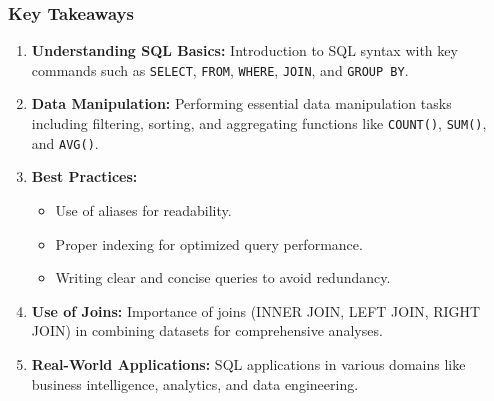 \documentclass{beamer}
\begin{document}
\begin{frame}[fragile]
    \frametitle{Key Takeaways}
    \begin{enumerate}
        \item \textbf{Understanding SQL Basics:} Introduction to SQL syntax with key commands such as \texttt{SELECT}, \texttt{FROM}, \texttt{WHERE}, \texttt{JOIN}, and \texttt{GROUP BY}.
        
        \item \textbf{Data Manipulation:} Performing essential data manipulation tasks including filtering, sorting, and aggregating functions like \texttt{COUNT()}, \texttt{SUM()}, and \texttt{AVG()}.
        
        \item \textbf{Best Practices:} 
        \begin{itemize}
            \item Use of aliases for readability.
            \item Proper indexing for optimized query performance.
            \item Writing clear and concise queries to avoid redundancy.
        \end{itemize}
        
        \item \textbf{Use of Joins:} Importance of joins (INNER JOIN, LEFT JOIN, RIGHT JOIN) in combining datasets for comprehensive analyses.
        
        \item \textbf{Real-World Applications:} SQL applications in various domains like business intelligence, analytics, and data engineering.
    \end{enumerate}
\end{frame}
\end{document}
